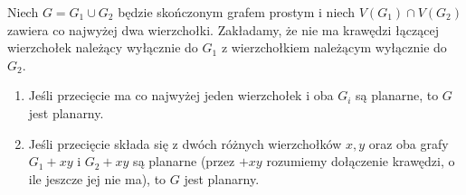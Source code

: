 \begin{lemat}
\label{lem:tg-kuratowski-gluing}
Niech $G=G_1\cup G_2$ będzie
skończonym grafem prostym i niech
$V(G_1)\cap V(G_2)$
zawiera co najwyżej dwa
wierzchołki. Zakładamy,
że nie ma krawędzi
łączącej wierzchołek
należący wyłącznie
do $G_1$ z wierzchołkiem
należącym wyłącznie
do $G_2$.
\begin{enumerate}[label=(\roman*)]
\item Jeśli przecięcie ma
co najwyżej jeden
wierzchołek i oba $G_i$
są planarne, to $G$
jest planarny.
\item Jeśli przecięcie
składa się z dwóch
różnych wierzchołków
$x,y$ oraz oba grafy
$G_1+xy$ i $G_2+xy$
są planarne (przez
$+xy$ rozumiemy
dołączenie krawędzi,
o ile jeszcze jej nie ma),
to $G$ jest planarny.
\end{enumerate}
\end{lemat}
